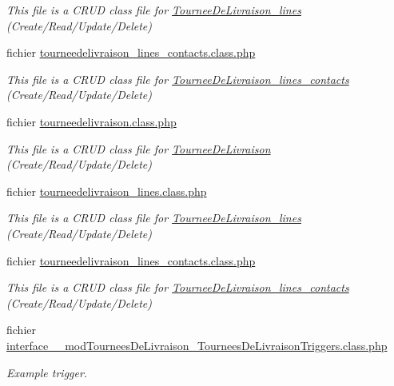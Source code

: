 \begin{DoxyCompactItemize}
\begin{DoxyCompactList}\small\item\em This file is a C\+R\+UD class file for \hyperlink{classTourneeDeLivraison__lines}{Tournee\+De\+Livraison\+\_\+lines} (Create/\+Read/\+Update/\+Delete) \end{DoxyCompactList}\item 
fichier \hyperlink{tourneedelivraison__lines__contacts_8class_8php}{tourneedelivraison\+\_\+lines\+\_\+contacts.\+class.\+php}
\begin{DoxyCompactList}\small\item\em This file is a C\+R\+UD class file for \hyperlink{classTourneeDeLivraison__lines__contacts}{Tournee\+De\+Livraison\+\_\+lines\+\_\+contacts} (Create/\+Read/\+Update/\+Delete) \end{DoxyCompactList}\item 
fichier \hyperlink{tourneedelivraison_8class_8php}{tourneedelivraison.\+class.\+php}
\begin{DoxyCompactList}\small\item\em This file is a C\+R\+UD class file for \hyperlink{classTourneeDeLivraison}{Tournee\+De\+Livraison} (Create/\+Read/\+Update/\+Delete) \end{DoxyCompactList}\item 
fichier \hyperlink{tourneedelivraison__lines_8class_8php}{tourneedelivraison\+\_\+lines.\+class.\+php}
\begin{DoxyCompactList}\small\item\em This file is a C\+R\+UD class file for \hyperlink{classTourneeDeLivraison__lines}{Tournee\+De\+Livraison\+\_\+lines} (Create/\+Read/\+Update/\+Delete) \end{DoxyCompactList}\item 
fichier \hyperlink{tourneedelivraison__lines__contacts_8class_8php}{tourneedelivraison\+\_\+lines\+\_\+contacts.\+class.\+php}
\begin{DoxyCompactList}\small\item\em This file is a C\+R\+UD class file for \hyperlink{classTourneeDeLivraison__lines__contacts}{Tournee\+De\+Livraison\+\_\+lines\+\_\+contacts} (Create/\+Read/\+Update/\+Delete) \end{DoxyCompactList}\item 
fichier \hyperlink{interface__99__modTourneesDeLivraison__TourneesDeLivraisonTriggers_8class_8php}{interface\+\_\+\_\+mod\+Tournees\+De\+Livraison\+\_\+\+Tournees\+De\+Livraison\+Triggers.\+class.\+php}
\begin{DoxyCompactList}\small\item\em Example trigger. \end{DoxyCompactList}\item 

\end{DoxyCompactItemize}
